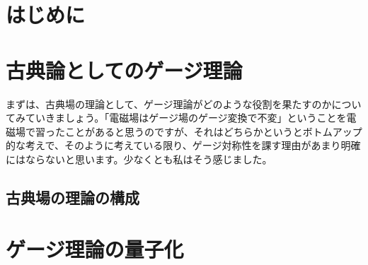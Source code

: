 \documentclass[unicode,a4paper,10pt]{ltjsarticle}
\begin{document}
\maketitle
\tableofcontents

\clearpage
\section{はじめに}




\clearpage
\section{古典論としてのゲージ理論}

まずは、古典場の理論として、ゲージ理論がどのような役割を果たすのかについてみていきましょう。「電磁場はゲージ場のゲージ変換で不変」ということを電磁場で習ったことがあると思うのですが、それはどちらかというとボトムアップ的な考えで、そのように考えている限り、ゲージ対称性を課す理由があまり明確にはならないと思います。少なくとも私はそう感じました。

\subsection{古典場の理論の構成}



















\clearpage
\section{ゲージ理論の量子化}














\clearpage



\nocite{Peskin:1995}

\end{document}
